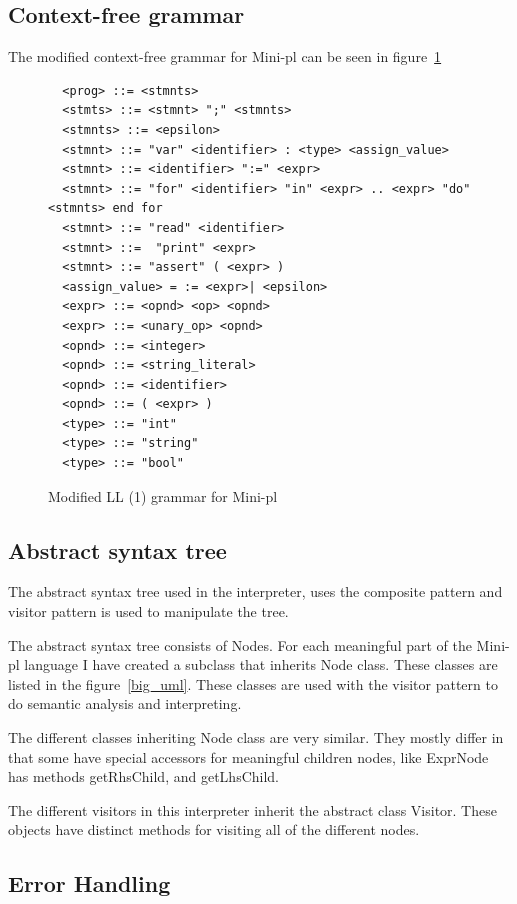 \documentclass[12pt,a4paper]{article}
\begin{document}
\subsection{Context-free grammar}
The modified context-free grammar for Mini-pl can be seen in figure~\ref{cfg}
\begin{figure}\label{cfg}
  \caption{Modified LL (1) grammar for Mini-pl}
  \begin{verbatim}
  <prog> ::= <stmnts>
  <stmts> ::= <stmnt> ";" <stmnts>
  <stmnts> ::= <epsilon>
  <stmnt> ::= "var" <identifier> : <type> <assign_value>
  <stmnt> ::= <identifier> ":=" <expr>
  <stmnt> ::= "for" <identifier> "in" <expr> .. <expr> "do" <stmnts> end for
  <stmnt> ::= "read" <identifier> 
  <stmnt> ::=  "print" <expr>
  <stmnt> ::= "assert" ( <expr> )
  <assign_value> = := <expr>| <epsilon>
  <expr> ::= <opnd> <op> <opnd>
  <expr> ::= <unary_op> <opnd>
  <opnd> ::= <integer>
  <opnd> ::= <string_literal>
  <opnd> ::= <identifier>
  <opnd> ::= ( <expr> )
  <type> ::= "int"
  <type> ::= "string"
  <type> ::= "bool"

  \end{verbatim}
\end{figure}

\subsection{Abstract syntax tree}
The abstract syntax tree used in the interpreter, uses the composite pattern and visitor
pattern is used to manipulate the tree. 

The abstract syntax tree consists of Nodes. For each meaningful part of the
Mini-pl language I have created a subclass that inherits Node class. These
classes are listed in the figure~\ref{big_uml}. These classes are used with the
visitor pattern to do semantic analysis and interpreting.

The different classes inheriting Node class are very similar. They mostly 
differ in that some have special accessors for meaningful children nodes, like
ExprNode has methods getRhsChild, and getLhsChild.

The different visitors in this interpreter inherit the abstract class Visitor.
These objects have distinct methods for visiting all of the different nodes.

\subsection{Error Handling}
\end{document}
